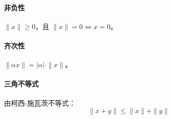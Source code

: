 \paragraph{非负性}  
\(\|x\| \geq 0\)，且 \(\|x\| = 0 \iff x = 0\)。

\paragraph{齐次性}  
\(\|\alpha x\| = |\alpha| \cdot \|x\|\)。

\paragraph{三角不等式}  
由柯西-施瓦茨不等式：
\[
\|x + y\| \leq \|x\| + \|y\|
\]
